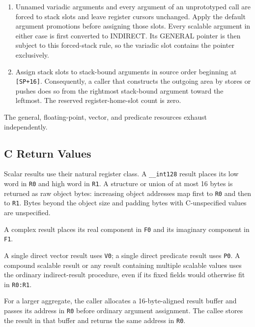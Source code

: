 \documentclass[10pt,twoside]{article}
\begin{document}
\begin{enumerate}[leftmargin=1.35em,itemsep=3pt,topsep=3pt]
slots, while register holes remain unassigned. Each argument occupies one
complete register location or one complete stack slot.
For VECTOR or PREDICATE, instead convert the complete argument to INDIRECT as
specified above and assign that pointer through GENERAL; exhausting a scalable
register class leaves GENERAL independently available.
\item Unnamed variadic arguments and every argument of an unprototyped call are
forced to stack slots and leave register cursors unchanged. Apply the default
argument promotions before assigning those slots.
Every scalable argument in either case is first converted to INDIRECT. Its
GENERAL pointer is then subject to this forced-stack rule, so the variadic slot
contains the pointer exclusively.
\item Assign stack slots to stack-bound arguments in source order beginning at
\texttt{[SP+16]}. Consequently, a caller that constructs the outgoing area by
stores or pushes does so from the rightmost stack-bound argument toward the
leftmost. The reserved register-home-slot count is zero.
\end{enumerate}

The general, floating-point, vector, and predicate resources exhaust
independently.

\subsection{C Return Values}
Scalar results use their natural register class. A \texttt{\_\_int128} result
places its low word in \texttt{R0} and high word in \texttt{R1}. A structure
or union of at most 16 bytes is returned as raw object bytes: increasing object
addresses map first to \texttt{R0} and then to \texttt{R1}. Bytes beyond the
object size and padding bytes with C-unspecified values are
unspecified.

A complex result places its real component in \texttt{F0} and its imaginary
component in \texttt{F1}.

A single direct vector result uses \texttt{V0}; a single direct predicate
result uses \texttt{P0}. A compound scalable result or any result containing
multiple scalable values uses the ordinary indirect-result procedure, even if
its fixed fields would otherwise fit in \texttt{R0:R1}.

For a larger aggregate, the caller allocates a 16-byte-aligned result buffer
and passes its address in \texttt{R0} before ordinary argument assignment. The
callee stores the result in that buffer and returns the same address in
\texttt{R0}.
\end{document}
